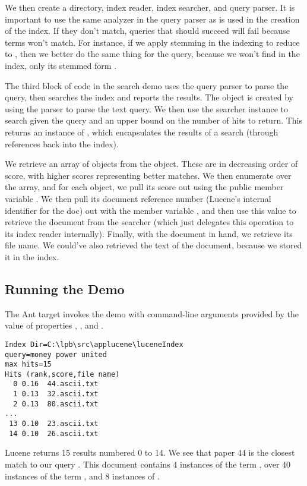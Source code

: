 We then create a directory, index reader, index searcher, and
query parser.
%
%
It is important to use the same analyzer in the query parser as is
used in the creation of the index.  If they don't match, queries that
should succeed will fail because terms won't match.  For instance, if
we apply stemming in the indexing to reduce  to
, then we better do the same thing for the query,
because we won't find  in the index, only its
stemmed form .

The third block of code in the search demo uses the query parser
to parse the query, then searches the index and reports the results.
%
%
The  object is created by using the parser to parse the
text query.  We then use the searcher instance to search given the
query and an upper bound on the number of hits to return.  This
returns an instance of , which encapsulates the results
of a search (through references back into the index).

We retrieve an array of  objects from the
 object.  These are in decreasing order of score, with
higher scores representing better matches.  We then enumerate over the
array, and for each  object, we pull its score out
using the public member variable .  We then pull its
document reference number (Lucene's internal identifier for the doc)
out with the member variable , and then use this value to
retrieve the document from the searcher (which just delegates this
operation to its index reader internally).  Finally, with the document
in hand, we retrieve its file name.  We could've also retrieved the
text of the document, because we stored it in the index.  

\subsection{Running the Demo}

The Ant target  invokes the demo with command-line
arguments provided by the value of properties ,
, and .
%
\begin{verbatim}
Index Dir=C:\lpb\src\applucene\luceneIndex
query=money power united
max hits=15
Hits (rank,score,file name)
  0 0.16  44.ascii.txt
  1 0.13  32.ascii.txt
  2 0.13  80.ascii.txt
...
 13 0.10  23.ascii.txt
 14 0.10  26.ascii.txt
\end{verbatim}
%
Lucene returns 15 results numbered 0 to 14.  We see that paper 44 is
the closest match to our query .  This
document contains 4 instances of the term , over
40 instances of the term , and 8 instances of 
.

